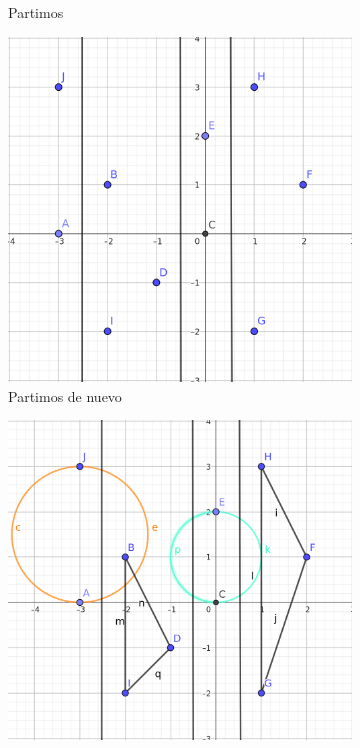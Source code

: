 \documentclass{article}
\begin{document}
\begin{figure}[H]
\begin{subfigure}[b]{0.3\textwidth}
        \caption{\centering Partimos}
        \label{fig:p3_ejemplo}
    \end{subfigure}
    \hfill
    \begin{subfigure}[b]{0.3\textwidth}
        \centering
        \includegraphics[width=\textwidth]{P3/Prosa/ejemplo_partir2.png}
        \caption{\centering Partimos de nuevo}
        \label{fig:p3_ejemplo}
    \end{subfigure}
    \newline
    \begin{subfigure}[b]{0.3\textwidth}
        \centering
        \includegraphics[width=\textwidth]{P3/Prosa/ejemplo_casos_base.png}

\end{subfigure}
\end{figure}
\end{document}
